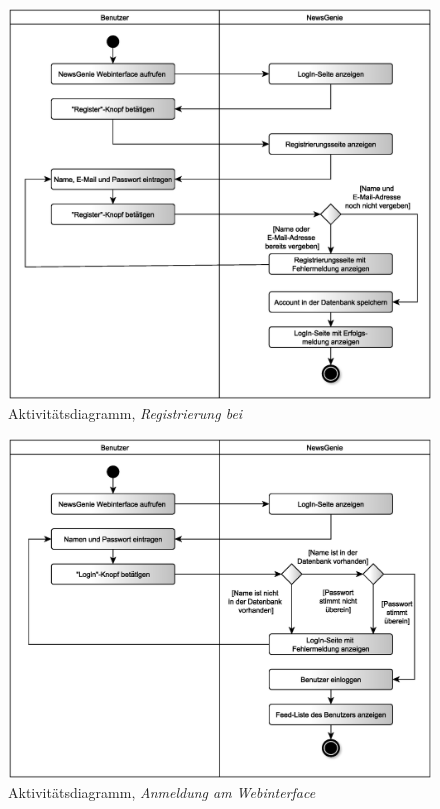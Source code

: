 \begin{figure}[h]
\centering
\includegraphics[width=1\textwidth]{Systementwurf/01_einleitung/register.eps}
\caption{Aktivitätsdiagramm, \textit{Registrierung bei \NewsGenie}
\label{1.2}}
\end{figure}

\begin{figure}[h]
\centering
\includegraphics[width=1\textwidth]{Systementwurf/01_einleitung/weblogin.eps}
\caption{Aktivitätsdiagramm, \textit{Anmeldung am Webinterface}
\label{1.3}}
\end{figure}

